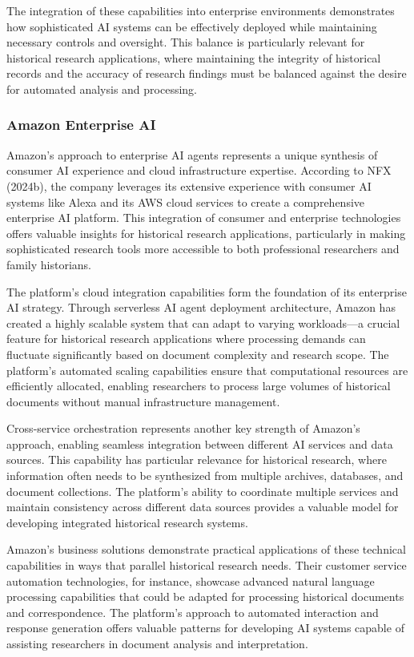 \documentclass[
]{article}
\begin{document}
The integration of these capabilities into enterprise environments
demonstrates how sophisticated AI systems can be effectively deployed
while maintaining necessary controls and oversight. This balance is
particularly relevant for historical research applications, where
maintaining the integrity of historical records and the accuracy of
research findings must be balanced against the desire for automated
analysis and processing.

\subsubsection{Amazon Enterprise AI}\label{amazon-enterprise-ai}

Amazon's approach to enterprise AI agents represents a unique synthesis
of consumer AI experience and cloud infrastructure expertise. According
to NFX (2024b), the company leverages its extensive experience with
consumer AI systems like Alexa and its AWS cloud services to create a
comprehensive enterprise AI platform. This integration of consumer and
enterprise technologies offers valuable insights for historical research
applications, particularly in making sophisticated research tools more
accessible to both professional researchers and family historians.

The platform's cloud integration capabilities form the foundation of its
enterprise AI strategy. Through serverless AI agent deployment
architecture, Amazon has created a highly scalable system that can adapt
to varying workloads---a crucial feature for historical research
applications where processing demands can fluctuate significantly based
on document complexity and research scope. The platform's automated
scaling capabilities ensure that computational resources are efficiently
allocated, enabling researchers to process large volumes of historical
documents without manual infrastructure management.

Cross-service orchestration represents another key strength of Amazon's
approach, enabling seamless integration between different AI services
and data sources. This capability has particular relevance for
historical research, where information often needs to be synthesized
from multiple archives, databases, and document collections. The
platform's ability to coordinate multiple services and maintain
consistency across different data sources provides a valuable model for
developing integrated historical research systems.

Amazon's business solutions demonstrate practical applications of these
technical capabilities in ways that parallel historical research needs.
Their customer service automation technologies, for instance, showcase
advanced natural language processing capabilities that could be adapted
for processing historical documents and correspondence. The platform's
approach to automated interaction and response generation offers
valuable patterns for developing AI systems capable of assisting
researchers in document analysis and interpretation.
\end{document}

